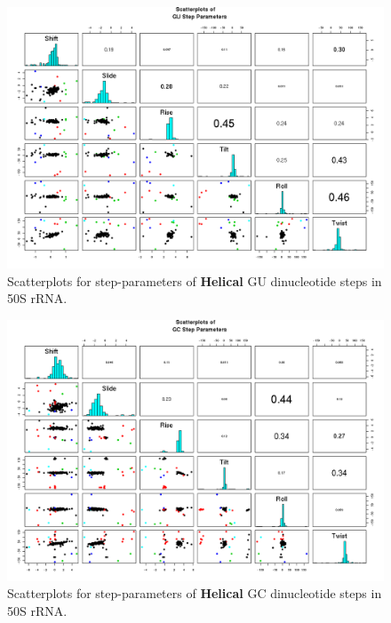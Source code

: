 \begin{figure}[H]
\centering
\includegraphics[angle=90, scale=0.6]{Helical/GU.png}
\caption{Scatterplots for step-parameters of \textbf{Helical} GU dinucleotide steps
in 50S rRNA.}
\label{fig:stepsGU}
\end{figure}

\begin{figure}[H]
\centering
\includegraphics[angle=90, scale=0.6]{Helical/GC.png}
\caption{Scatterplots for step-parameters of \textbf{Helical} GC dinucleotide steps
in 50S rRNA.}
\label{fig:stepsGC}
\end{figure}


